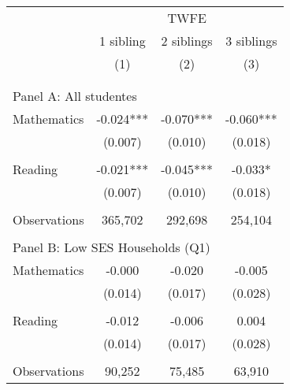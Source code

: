 \makeatletter
{}
{
\makeatother
\begin{tabular}{lccc}
\toprule
\cmidrule(lr){2-4}
& \multicolumn{3}{c}{TWFE} \\
\cmidrule(lr){2-4}
& 1 sibling & 2 siblings & 3 siblings  \\
\cmidrule(lr){2-2} \cmidrule(lr){3-3} \cmidrule(lr){4-4}
& (1) & (2) & (3)\\
\bottomrule
&  &  &  \\
&  &  &   \\
\multicolumn{4}{l}{Panel A: All studentes } \\
\hspace{3mm}Mathematics&      -0.024***&      -0.070***&      -0.060***\\
                    &     (0.007)   &     (0.010)   &     (0.018)   \\
 
&  &  &   \\
\hspace{3mm}Reading &      -0.021***&      -0.045***&      -0.033*  \\
                    &     (0.007)   &     (0.010)   &     (0.018)   \\
                    &               &               &               \\
\hspace{3mm}Observations&     365,702   &     292,698   &     254,104   \\
 
&  &  &   \\
\multicolumn{4}{l}{Panel B: Low SES Households (Q1)} \\
\hspace{3mm}Mathematics&      -0.000   &      -0.020   &      -0.005   \\
                    &     (0.014)   &     (0.017)   &     (0.028)   \\
 
&  &  &   \\
\hspace{3mm}Reading &      -0.012   &      -0.006   &       0.004   \\
                    &     (0.014)   &     (0.017)   &     (0.028)   \\
                    &               &               &               \\
\hspace{3mm}Observations&      90,252   &      75,485   &      63,910   \\
 

\end{tabular}}
